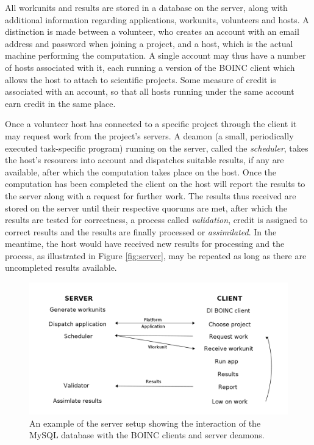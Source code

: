 All workunits and results are stored in a database on the server, along with additional information regarding applications, workunits, volunteers and hosts. A distinction is made between a volunteer, who creates an account with an email address and password when joining a project, and a host, which is the actual machine performing the computation. A single account may thus have a number of hosts associated with it, each running a version of the BOINC client which allows the host to attach to scientific projects. Some measure of credit is associated with an account, so that all hosts running under the same account earn credit in the same place.

Once a volunteer host has  connected to a specific project through the client it may request work from the project's servers. 
A deamon (a small, periodically executed task-specific program) running on the server,  called the \emph{scheduler}, takes the host's resources into account and dispatches suitable results, if any are available, after which the computation takes place on the host. 
Once the computation has been completed the client on the host will  report the results to the server along with a   request for further work. 
The   results thus received are stored on the server until their respective quorums are met, after which the results are tested for correctness, a process called \emph{validation},   credit is assigned to correct results and the results are finally processed or \emph{assimilated}. 
In the meantime, the host would have received new results for processing and the process, as illustrated in Figure \ref{fig:server}, may be repeated as long as there are uncompleted results available.
\begin{figure}[htb]
\centering
\includegraphics[width=14cm]{images/workflow}
\caption{An example of the server setup showing the interaction of the MySQL database with the BOINC clients and server deamons.}\label{fig:workflow}
\end{figure}


